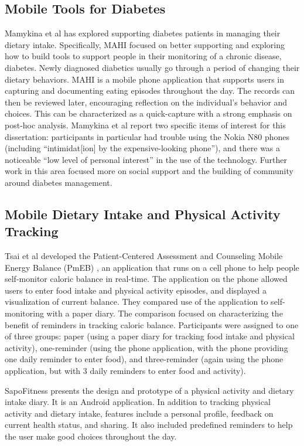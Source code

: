 \subsection{Mobile Tools for Diabetes}
Mamykina et al \citep{mamykina_examining_2011, mamykina_mahi:_2008} has explored supporting diabetes patients in managing their dietary intake. Specifically, MAHI focused on better supporting and exploring how to build tools to support people in their monitoring of a chronic disease, diabetes. Newly diagnosed diabetics usually go through a period of changing their dietary behaviors. MAHI is a mobile phone application that supports users in capturing and documenting eating episodes throughout the day. The records can then be reviewed later, encouraging reflection on the individual's behavior and choices. This can be characterized as a quick-capture with a strong emphasis on post-hoc analysis. Mamykina et al report \citep{mamykina_mahi:_2008} two specific items of interest for this dissertation: participants in particular had trouble using the Nokia N80 phones (including ``intimidat[ion] by the expensive-looking phone''), and there was a noticeable ``low level of personal interest'' in the use of the technology. Further work in this area focused more on social support and the building of community around diabetes management. 

\subsection{Mobile Dietary Intake and Physical Activity Tracking}
Tsai et al developed the Patient-Centered Assessment and Counseling Mobile Energy Balance (PmEB) \citep{tsai_usability_2007},  an application that runs on a cell phone to help people self-monitor caloric balance in real-time.  The application on the phone allowed users to enter food intake and physical activity episodes, and displayed a visualization of current balance. They compared use of the application to self-monitoring with a paper diary. The comparison focused on characterizing the benefit of reminders in tracking caloric balance. Participants were assigned to one of three groups: paper (using a paper diary for tracking food intake and physical activity), one-reminder (using the phone application, with the phone providing one daily reminder to enter food), and three-reminder (again using the phone application, but with 3 daily reminders to enter food and activity). 


SapoFitness \citep{silva_sapofitness:_2011} presents the design and prototype of a physical activity and dietary intake diary. It is an Android application. In addition to tracking physical activity and dietary intake, features include a personal profile, feedback on current health status, and sharing. It also included predefined reminders to help the user make good choices throughout the day. 




